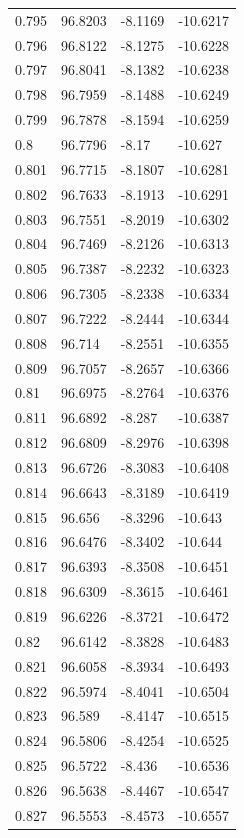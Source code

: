 \begin{tabular}{llll}
0.795 & 96.8203 & -8.1169 & -10.6217 \\
0.796 & 96.8122 & -8.1275 & -10.6228 \\
0.797 & 96.8041 & -8.1382 & -10.6238 \\
0.798 & 96.7959 & -8.1488 & -10.6249 \\
0.799 & 96.7878 & -8.1594 & -10.6259 \\
0.8 & 96.7796 & -8.17 & -10.627 \\
0.801 & 96.7715 & -8.1807 & -10.6281 \\
0.802 & 96.7633 & -8.1913 & -10.6291 \\
0.803 & 96.7551 & -8.2019 & -10.6302 \\
0.804 & 96.7469 & -8.2126 & -10.6313 \\
0.805 & 96.7387 & -8.2232 & -10.6323 \\
0.806 & 96.7305 & -8.2338 & -10.6334 \\
0.807 & 96.7222 & -8.2444 & -10.6344 \\
0.808 & 96.714 & -8.2551 & -10.6355 \\
0.809 & 96.7057 & -8.2657 & -10.6366 \\
0.81 & 96.6975 & -8.2764 & -10.6376 \\
0.811 & 96.6892 & -8.287 & -10.6387 \\
0.812 & 96.6809 & -8.2976 & -10.6398 \\
0.813 & 96.6726 & -8.3083 & -10.6408 \\
0.814 & 96.6643 & -8.3189 & -10.6419 \\
0.815 & 96.656 & -8.3296 & -10.643 \\
0.816 & 96.6476 & -8.3402 & -10.644 \\
0.817 & 96.6393 & -8.3508 & -10.6451 \\
0.818 & 96.6309 & -8.3615 & -10.6461 \\
0.819 & 96.6226 & -8.3721 & -10.6472 \\
0.82 & 96.6142 & -8.3828 & -10.6483 \\
0.821 & 96.6058 & -8.3934 & -10.6493 \\
0.822 & 96.5974 & -8.4041 & -10.6504 \\
0.823 & 96.589 & -8.4147 & -10.6515 \\
0.824 & 96.5806 & -8.4254 & -10.6525 \\
0.825 & 96.5722 & -8.436 & -10.6536 \\
0.826 & 96.5638 & -8.4467 & -10.6547 \\
0.827 & 96.5553 & -8.4573 & -10.6557 \\

\end{tabular}
